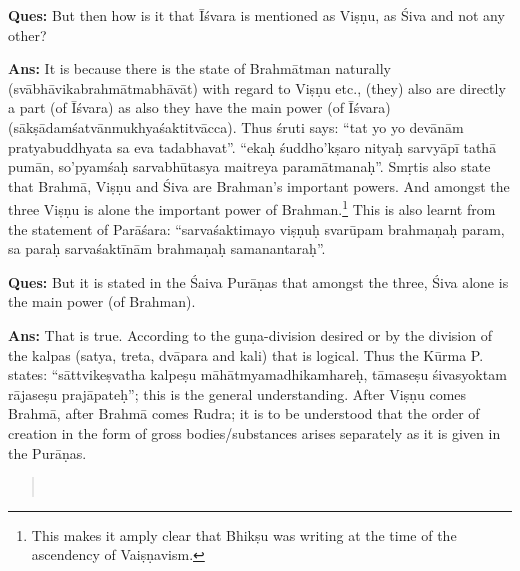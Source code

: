 \textbf{Ques:} But then how is it that Īśvara is mentioned as Viṣṇu, as Śiva and not any other? 

\textbf{Ans:} It is because there is the state of Brahmātman naturally (svābhāvikabrahmātmabhāvāt) with regard to Viṣṇu etc., (they) also are  directly a part (of Īśvara) as also  they have the main power (of Īśvara) (sākṣādamśatvānmukhyaśaktitvācca). Thus śruti says: “tat yo yo devānām pratyabuddhyata sa eva tadabhavat”. “ekaḥ śuddho’kṣaro nityaḥ sarvyāpī tathā pumān, so’pyamśaḥ sarvabhūtasya maitreya paramātmanaḥ”.  Smṛtis also state that Brahmā, Viṣṇu and Śiva are Brahman’s important powers. And amongst the three Viṣṇu is alone the important power of Brahman.\footnote{This makes it amply clear that Bhikṣu was writing at the time of the ascendency of Vaiṣṇavism.} This is also learnt from the statement of Parāśara: “sarvaśaktimayo viṣṇuḥ svarūpam brahmaṇaḥ param, sa paraḥ sarvaśaktīnām brahmaṇaḥ samanantaraḥ”.

\textbf{Ques:} But it is stated in the Śaiva Purāṇas that amongst the three, Śiva alone is the main power (of Brahman). 

\textbf{Ans:} That is true. According to the guṇa-division desired or by the division of the kalpas (satya, treta, dvāpara and kali) that is logical. Thus the Kūrma P. states: “sāttvikeṣvatha kalpeṣu māhātmyamadhikam\break hareḥ, tāmaseṣu śivasyoktam rājaseṣu prajāpateḥ”; this is the general understanding. After Viṣṇu comes Brahmā, after Brahmā comes Rudra; it is to be understood that the order of creation in the form of gross bodies/substances arises separately as it is given in the Purāṇas.

\begin{verse}
\end{verse}

\newpage

\begin{verse}
\\
\end{verse}

